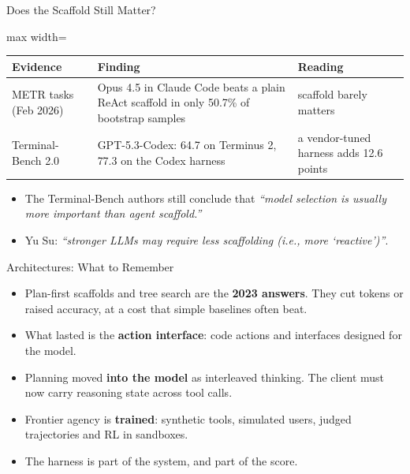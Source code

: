 \begin{frame}{Does the Scaffold Still Matter?}
    \begin{center}
    \small
    \renewcommand{\arraystretch}{1.2}
    \begin{adjustbox}{max width=\linewidth}\begin{tabular}{>{\raggedright\arraybackslash}p{3.4cm}>{\raggedright\arraybackslash}p{6.0cm}>{\raggedright\arraybackslash}p{3.6cm}}
        \toprule
        \textbf{Evidence} & \textbf{Finding} & \textbf{Reading} \\
        \midrule
        METR tasks (Feb 2026) & Opus 4.5 in Claude Code beats a plain ReAct scaffold in only 50.7\% of bootstrap samples & scaffold barely matters \\
        Terminal-Bench 2.0 & GPT-5.3-Codex: 64.7 on Terminus 2, 77.3 on the Codex harness & a vendor-tuned harness adds \alert{12.6 points} \\
        \bottomrule
    \end{tabular}\end{adjustbox}
    \end{center}
    \begin{itemize}\itemsep0.4em
        \item The Terminal-Bench authors still conclude that \emph{``model selection is usually more important than agent scaffold.''}
        \item Yu Su: \emph{``stronger LLMs may require less scaffolding (i.e., more `reactive')''}.
    \end{itemize}
\end{frame}

\begin{frame}{Architectures: What to Remember}
    \begin{itemize}\itemsep0.6em
        \item Plan-first scaffolds and tree search are the \textbf{2023 answers}. They cut tokens or raised accuracy, at a cost that simple baselines often beat.
        \item What lasted is the \textbf{action interface}: code actions and interfaces designed for the model.
        \item Planning moved \textbf{into the model} as interleaved thinking. The client must now carry reasoning state across tool calls.
        \item Frontier agency is \textbf{trained}: synthetic tools, simulated users, judged trajectories and RL in sandboxes.
        \item The harness is part of the system, and part of the score.
    \end{itemize}
    \vspace{0.4em}
\end{frame}
